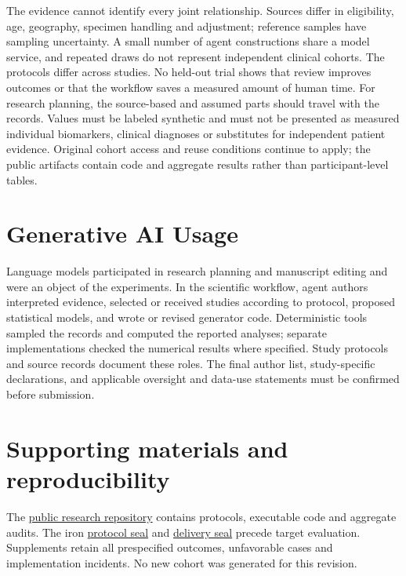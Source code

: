 \documentclass[sigconf,review]{acmart}
\begin{document}
The evidence cannot identify every joint relationship. Sources differ in eligibility, age, geography, specimen handling and adjustment; reference samples have sampling uncertainty. A small number of agent constructions share a model service, and repeated draws do not represent independent clinical cohorts. The protocols differ across studies. No held-out trial shows that review improves outcomes or that the workflow saves a measured amount of human time. For research planning, the source-based and assumed parts should travel with the records. Values must be labeled synthetic and must not be presented as measured individual biomarkers, clinical diagnoses or substitutes for independent patient evidence. Original cohort access and reuse conditions continue to apply; the public artifacts contain code and aggregate results rather than participant-level tables.


\section{Generative AI Usage}

Language models participated in research planning and manuscript editing and were an object of the experiments. In the scientific workflow, agent authors interpreted evidence, selected or received studies according to protocol, proposed statistical models, and wrote or revised generator code. Deterministic tools sampled the records and computed the reported analyses; separate implementations checked the numerical results where specified. Study protocols and source records document these roles. The final author list, study-specific declarations, and applicable oversight and data-use statements must be confirmed before submission.


\section*{Supporting materials and reproducibility}

The \href{https://github.com/ziwang11112/evidence-guided-virtual-cohorts-2026}{public research repository} contains protocols, executable code and aggregate audits. The iron \href{https://github.com/ziwang11112/evidence-guided-virtual-cohorts-2026/commit/bedd845768c1c938768f58fce685f53cbf97f3df}{protocol seal} and \href{https://github.com/ziwang11112/evidence-guided-virtual-cohorts-2026/commit/c88192edeb0bc63b60d0bfe6e3a7282ced9d2975}{delivery seal} precede target evaluation. Supplements retain all prespecified outcomes, unfavorable cases and implementation incidents. No new cohort was generated for this revision.
\end{document}
